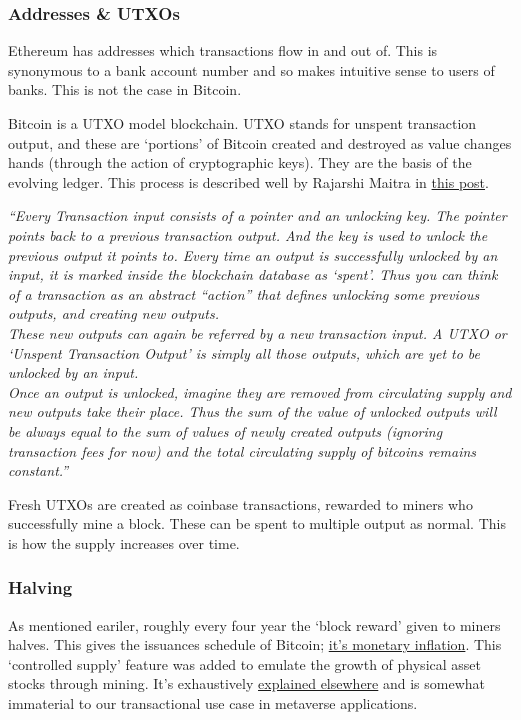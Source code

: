 \subsubsection{Addresses \& UTXOs}
Ethereum has addresses which transactions flow in and out of. This is synonymous to a bank account number and so makes intuitive sense to users of banks. This is not the case in Bitcoin.\par
Bitcoin is a UTXO model blockchain. UTXO stands for unspent transaction output, and these are `portions' of Bitcoin created and destroyed as value changes hands (through the action of cryptographic keys). They are the basis of the evolving ledger. This process is described well by Rajarshi Maitra in \href{https://medium.com/bitbees/what-the-heck-is-utxo-ca68f2651819}{this post}.\par
\textit{``Every Transaction input consists of a pointer and an unlocking key. The pointer points back to a previous transaction output. And the key is used to unlock the previous output it points to. Every time an output is successfully unlocked by an input, it is marked inside the blockchain database as `spent'. Thus you can think of a transaction as an abstract “action” that defines unlocking some previous outputs, and creating new outputs.\\
These new outputs can again be referred by a new transaction input. A UTXO or `Unspent Transaction Output' is simply all those outputs, which are yet to be unlocked by an input.\\
Once an output is unlocked, imagine they are removed from circulating supply and new outputs take their place. Thus the sum of the value of unlocked outputs will be always equal to the sum of values of newly created outputs (ignoring transaction fees for now) and the total circulating supply of bitcoins remains constant.''}\par
Fresh UTXOs are created as coinbase transactions, rewarded to miners who successfully mine a block. These can be spent to multiple output as normal. This is how the supply increases over time.
\subsubsection{Halving}
As mentioned eariler, roughly every four year the `block reward' given to miners halves. This gives the issuances schedule of Bitcoin; \href{http://bashco.github.io/Bitcoin_Monetary_Inflation/}{it's monetary inflation}. This `controlled supply' feature was added to emulate the growth of physical asset stocks through mining. It's exhaustively \href{https://en.bitcoin.it/wiki/Controlled_supply}{explained elsewhere} and is somewhat immaterial to our transactional use case in metaverse applications.
